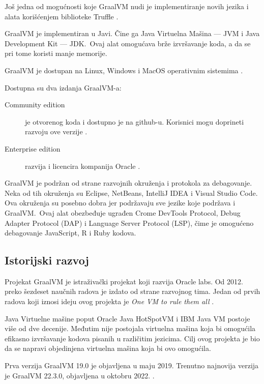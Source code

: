 \documentclass[a4paper]{article}
\begin{document}
Još jedna od mogućnosti koje GraalVM nudi je implementiranje novih jezika i alata korišćenjem biblioteke Truffle \cite{graalvmtruffle}.

GraalVM je implementiran u Javi. Čine ga Java Virtuelna Mašina --- JVM i Java Development Kit --- JDK.\ Ovaj alat omogućava brže izvršavanje koda, a da se pri tome koristi manje memorije.

GraalVM je dostupan na Linux, Windows i MacOS operativnim sistemima \cite{graalvmintroduction}.

Dostupna su dva izdanja GraalVM-a:

\begin{description}
	\item [Community edition] je otvorenog koda i dostupno je na github-u. Korisnici mogu doprineti razvoju ove verzije \cite{graalvmCommunity}.
	\item [Enterprise edition] razvija i licencira kompanija Oracle \cite{graalvmEnterprise}.
\end{description}

GraalVM je podržan od strane razvojnih okruženja i protokola za debagovanje. Neka od tih okruženja su Eclipse, NetBeans, IntelliJ IDEA i Visual Studio Code. Ova okruženja su posebno dobra jer podržavaju sve jezike koje podržava i GraalVM.\ Ovaj alat obezbeđuje ugrađen Crome DevTools Protocol, Debug Adapter Protocol (DAP) i Language Server Protocol (LSP), čime je omogućeno debagovanje JavaScript, R i Ruby kodova.

\subsection{Istorijski razvoj}
\label{subsec:istorija}

Projekat GraalVM je istraživački projekat koji razvija Oracle labs. Od 2012. preko šezdeset naučnih radova je izdato od strane razvojnog tima. Jedan od prvih radova koji iznosi ideju ovog projekta je \textit{One VM to rule them all} \cite{onevmtorulethemall}.

Java Virtuelne mašine poput Oracle Java HotSpotVM i IBM Java VM postoje više od dve decenije. Međutim nije postojala virtuelna mašina koja bi omogućila efikasno izvršavanje kodova pisanih u različitim jezicima. Cilj ovog projekta je bio da se napravi objedinjena virtuelna mašina koja bi ovo omogućila.

Prva verzija GraalVM 19.0 je objavljena u maju 2019. Trenutno najnovija verzija je GraalVM 22.3.0, objavljena u oktobru 2022. \cite{graalvmreleases}.
\end{document}
